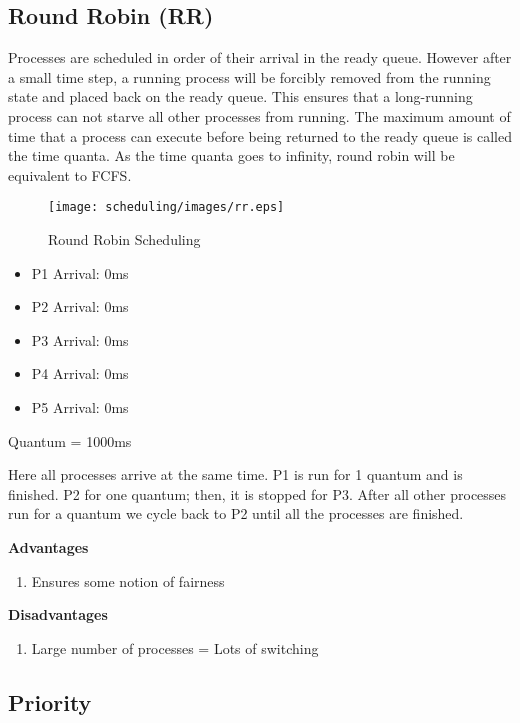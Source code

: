 \subsection{Round Robin (RR)}

Processes are scheduled in order of their arrival in the ready queue.
However after a small time step, a running process will be forcibly removed from the running state and placed back on the ready queue.
This ensures that a long-running process can not starve all other processes from running.
The maximum amount of time that a process can execute before being returned to the ready queue is called the time quanta.
As the time quanta goes to infinity, round robin will be equivalent to FCFS.

\begin{figure}[htbp]
\centering
\texttt{[image: scheduling/images/rr.eps]}
\caption{Round Robin Scheduling}
\end{figure}

\begin{itemize}
\tightlist
\item
  P1 Arrival: 0ms
\item
  P2 Arrival: 0ms
\item
  P3 Arrival: 0ms
\item
  P4 Arrival: 0ms
\item
  P5 Arrival: 0ms
\end{itemize}

Quantum = 1000ms

Here all processes arrive at the same time.
P1 is run for 1 quantum and is finished.
P2 for one quantum; then, it is stopped for P3.
After all other processes run for a quantum we cycle back to P2 until all the processes are finished.

\textbf{Advantages}

\begin{enumerate}
  \item Ensures some notion of fairness
\end{enumerate}

\textbf{Disadvantages}

\begin{enumerate}
  \item Large number of processes = Lots of switching
\end{enumerate}

\subsection{Priority}

